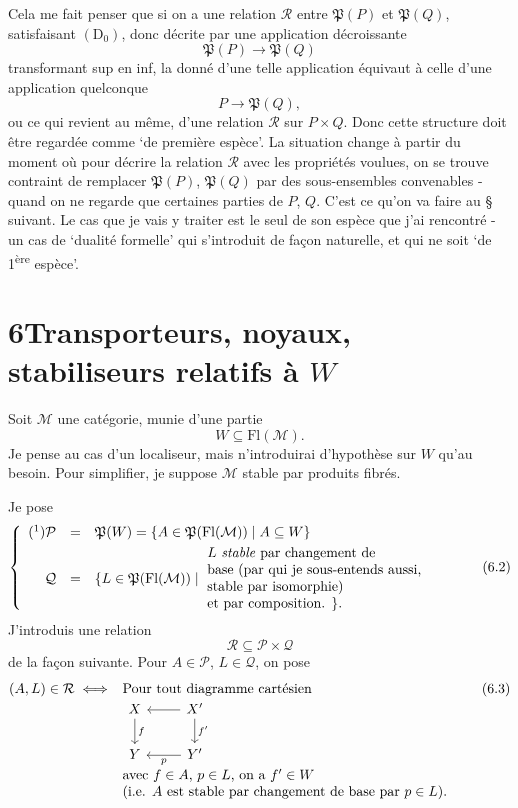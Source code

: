 \documentclass[11pt]{article}
\newcommand{\printedpage}[1]{\marginpar{\footnotesize p.~#1}}
\newcommand{\msp}[1]{\marginpar{\footnotesize [#1]}}
\newcommand{\Fl}{\mathrm{Fl}}
\newcommand{\Pf}{\mathfrak{P}}
\begin{document}
Cela me fait penser que si on a une relation $\mathcal{R}$ entre $\Pf(P)$ et $\Pf(Q)$, satisfaisant $(\mathrm{D}_0)$, donc décrite par une application décroissante
\[
\Pf(P)\longrightarrow\Pf(Q)
\]
transformant sup en inf, la donné d'une telle application équivaut à celle d'une application quelconque %
\[
P\longrightarrow\Pf(Q),
\]
ou ce qui revient au même, d'une relation $\mathcal{R}$ sur $P\times Q$. Donc cette structure doit être regardée comme ‘de première espèce’. La situation change à partir du moment où pour décrire la relation $\mathcal{R}$ avec les propriétés voulues, on se trouve contraint de remplacer $\Pf(P)$, $\Pf(Q)$ par des sous-ensembles convenables - quand on ne regarde que certaines parties de $P$, $Q$. C'est ce qu'on
\msp{page 83}va faire au § suivant. Le cas que je vais y traiter est le seul de son espèce que j'ai rencontré - un cas de ‘dualité formelle’ qui s'introduit de façon naturelle, et qui ne soit ‘de 1\textsuperscript{ère} espèce’.

\printedpage{51}
\section*{6\quad Transporteurs, noyaux, stabiliseurs relatifs à $W$}

Soit $\mathcal{M}$ une catégorie, munie d'une partie
\[
W\subseteq\Fl(\mathcal{M}).
\tag*{(6.1)}
\]
Je pense au cas d'un localiseur, mais n'introduirai d'hypothèse sur $W$ qu'au besoin. Pour simplifier, je suppose $\mathcal{M}$ stable par produits fibrés.

Je pose
\[
\left\{
\begin{array}{rcl}
\mbox{(\footnotemark)}\mathcal{P} & = & \Pf(W)=\{A\in\Pf(\Fl(\mathcal{M}))\mid A\subseteq W\}\\[1ex]
\mathcal{Q} & = & \{L\in\Pf(\Fl(\mathcal{M}))\mid\
\parbox[c]{17em}{$L$ \textit{stable} par changement de\\
base (par qui je sous-entends aussi,\\
stable par isomorphie)\\
et par composition. $\}$.}
\end{array}
\right.
\tag*{(6.2)}
\]
J'introduis une relation
\[
\mathcal{R}\subseteq\mathcal{P}\times\mathcal{Q}
\]
de la façon suivante. Pour $A\in\mathcal{P}$, $L\in\mathcal{Q}$, on pose
\[
(A,L)\in\mathcal{R}\iff
\begin{array}[t]{l}
\text{Pour tout diagramme cartésien}\\
\begin{tikzcd}[ampersand replacement=\&]
X \arrow[d, "f"] \& X' \arrow[l] \arrow[d, "f'"] \\
Y \& Y' \arrow[l, "p"]
\end{tikzcd}\\
\text{avec $f\in A$, $p\in L$, on a $f'\in W$}\\
\text{(i.e. $A$ est stable par changement de base par $p\in L$).}
\end{array}
\tag*{(6.3)}
\]
\end{document}
